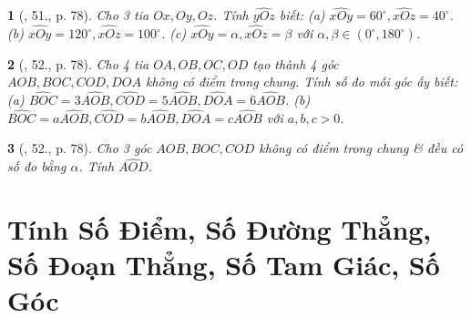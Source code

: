 \documentclass{article}
\newtheorem{baitoan}{}
\begin{document}
\begin{baitoan}[\cite{Binh_Toan_6_tap_2}, 51., p. 78]
	Cho 3 tia $Ox,Oy,Oz$. Tính $\widehat{yOz}$ biết: (a) $\widehat{xOy} = 60^\circ,\widehat{xOz} = 40^\circ$. (b) $\widehat{xOy} = 120^\circ,\widehat{xOz} = 100^\circ$. (c) $\widehat{xOy} = \alpha,\widehat{xOz} = \beta$ với $\alpha,\beta\in(0^\circ,180^\circ)$.
\end{baitoan}

\begin{baitoan}[\cite{Binh_Toan_6_tap_2}, 52., p. 78]
	Cho 4 tia $OA,OB,OC,OD$ tạo thành 4 góc $AOB,BOC,COD,DOA$ không có điểm trong chung. Tính số đo mỗi góc ấy biết: (a) $\widehat{BOC} = 3\widehat{AOB},\widehat{COD} = 5\widehat{AOB},\widehat{DOA} = 6\widehat{AOB}$. (b) $\widehat{BOC} = a\widehat{AOB},\widehat{COD} = b\widehat{AOB},\widehat{DOA} = c\widehat{AOB}$ với $a,b,c > 0$.
\end{baitoan}

\begin{baitoan}[\cite{Binh_Toan_6_tap_2}, 52., p. 78]
	Cho 3 góc $AOB,BOC,COD$ không có điểm trong chung \& đều có số đo bằng $\alpha$. Tính $\widehat{AOD}$.
\end{baitoan}


\section{Tính Số Điểm, Số Đường Thẳng, Số Đoạn Thẳng, Số Tam Giác, Số Góc}


\printbibliography[heading=bibintoc]
	
\end{document}
